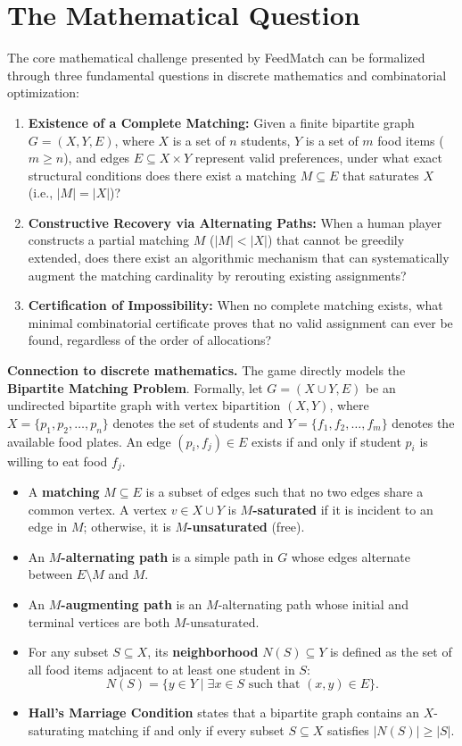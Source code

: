 \documentclass[11pt,a4paper]{article}
\begin{document}
\section{The Mathematical Question}
The core mathematical challenge presented by FeedMatch can be formalized through three fundamental questions in discrete mathematics and combinatorial optimization:

\begin{enumerate}
  \item \textbf{Existence of a Complete Matching:} Given a finite bipartite graph $G = (X, Y, E)$, where $X$ is a set of $n$ students, $Y$ is a set of $m$ food items ($m \ge n$), and edges $E \subseteq X \times Y$ represent valid preferences, under what exact structural conditions does there exist a matching $M \subseteq E$ that saturates $X$ (i.e., $|M| = |X|$)?
  \item \textbf{Constructive Recovery via Alternating Paths:} When a human player constructs a partial matching $M$ ($|M| < |X|$) that cannot be greedily extended, does there exist an algorithmic mechanism that can systematically augment the matching cardinality by rerouting existing assignments?
  \item \textbf{Certification of Impossibility:} When no complete matching exists, what minimal combinatorial certificate proves that no valid assignment can ever be found, regardless of the order of allocations?
\end{enumerate}

\textbf{Connection to discrete mathematics.}
The game directly models the \textbf{Bipartite Matching Problem}. Formally, let $G = (X \cup Y, E)$ be an undirected bipartite graph with vertex bipartition $(X, Y)$, where $X = \{p_1, p_2, \dots, p_n\}$ denotes the set of students and $Y = \{f_1, f_2, \dots, f_m\}$ denotes the available food plates. An edge $(p_i, f_j) \in E$ exists if and only if student $p_i$ is willing to eat food $f_j$.

\begin{itemize}
  \item A \textbf{matching} $M \subseteq E$ is a subset of edges such that no two edges share a common vertex. A vertex $v \in X \cup Y$ is \textbf{$M$-saturated} if it is incident to an edge in $M$; otherwise, it is \textbf{$M$-unsaturated} (free).
  \item An \textbf{$M$-alternating path} is a simple path in $G$ whose edges alternate between $E \setminus M$ and $M$.
  \item An \textbf{$M$-augmenting path} is an $M$-alternating path whose initial and terminal vertices are both $M$-unsaturated.
  \item For any subset $S \subseteq X$, its \textbf{neighborhood} $N(S) \subseteq Y$ is defined as the set of all food items adjacent to at least one student in $S$:
  \[
    N(S) = \{y \in Y \mid \exists x \in S \text{ such that } (x, y) \in E\}.
  \]
  \item \textbf{Hall's Marriage Condition} states that a bipartite graph contains an $X$-saturating matching if and only if every subset $S \subseteq X$ satisfies $|N(S)| \ge |S|$.
\end{itemize}
\end{document}
